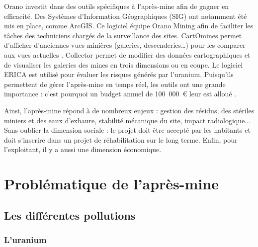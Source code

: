 \documentclass{article}
\begin{document}
Orano investit dans des outils spécifiques à l’après-mine afin de gagner en efficacité. Des Systèmes d’Information Géographiques (SIG) ont notamment été mis en place, comme ArcGIS. Ce logiciel équipe Orano Mining afin de faciliter les tâches des techniciens chargés de la surveillance des sites.
CartOmines permet d’afficher d’anciennes vues minières (galeries, descenderies…) pour les comparer aux vues actuelles \cite{noauthor_cartomines_nodate}. Collector permet de modifier des données cartographiques et de visualiser les galeries des mines en trois dimensions ou en coupe. Le logiciel ERICA est utilisé pour évaluer les risques générés par l’uranium. Puisqu’ils permettent de gérer l’après-mine en temps réel, les outils ont une grande importance : c’est pourquoi un budget annuel de 100~000~\euro{} leur est alloué \cite{gerland_outils_2020}.

Ainsi, l’après-mine répond à de nombreux enjeux : gestion des résidus, des stériles miniers et des eaux d’exhaure, stabilité mécanique du site, impact radiologique... Sans oublier la dimension sociale : le projet doit être accepté par les habitants et doit s’inscrire dans un projet de réhabilitation sur le long terme. Enfin, pour l’exploitant, il y a aussi une dimension économique.


\newpage
\section{Problématique de l’après-mine}
\subsection{Les différentes pollutions}
\subsubsection{L'uranium}
\end{document}
